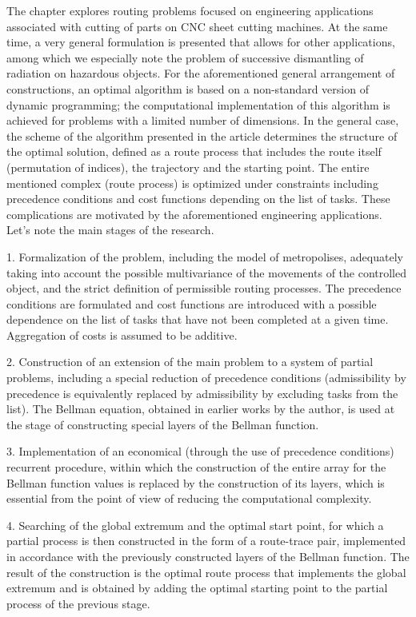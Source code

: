 \label{sec:6}
The chapter explores routing problems focused on engineering applications associated with cutting of parts on CNC sheet cutting machines. At the same time, a very general formulation is presented that allows for other applications, among which we especially note the problem of successive dismantling of radiation on hazardous objects. For the aforementioned general arrangement of constructions, an optimal algorithm is based on a non-standard version of dynamic programming; the computational implementation of this algorithm is achieved for problems with a limited number of dimensions. In the general case, the scheme of the algorithm presented in the article determines the structure of the optimal solution, defined as a route process that includes the route itself (permutation of indices), the trajectory and the starting point. The entire mentioned complex (route process) is optimized under constraints including precedence conditions and cost functions depending on the list of tasks. These complications are motivated by the aforementioned engineering applications. Let's note the main stages of the research.

1. Formalization of the problem, including the model of metropolises, adequately taking into account the possible multivariance of the movements of the controlled object, and the strict definition of permissible routing processes. The precedence conditions are formulated and cost functions are introduced with a possible dependence on the list of tasks that have not been completed at a given time. Aggregation of costs is assumed to be additive.

2. Construction of an extension of the main problem to a system of partial problems, including a special reduction of precedence conditions (admissibility by precedence is equivalently replaced by admissibility by excluding tasks from the list). The Bellman equation, obtained in earlier works by the author, is used at the stage of constructing special layers of the Bellman function.

3. Implementation of an economical (through the use of precedence conditions) recurrent procedure, within which the construction of the entire array for the Bellman function values is replaced by the construction of its layers, which is essential from the point of view of reducing the computational complexity.

4. Searching of the global extremum and the optimal start point, for which a partial process is then constructed in the form of a route-trace pair, implemented in accordance with the previously constructed layers of the Bellman function. The result of the construction is the optimal route process that implements the global extremum and is obtained by adding the optimal starting point to the partial process of the previous stage.

